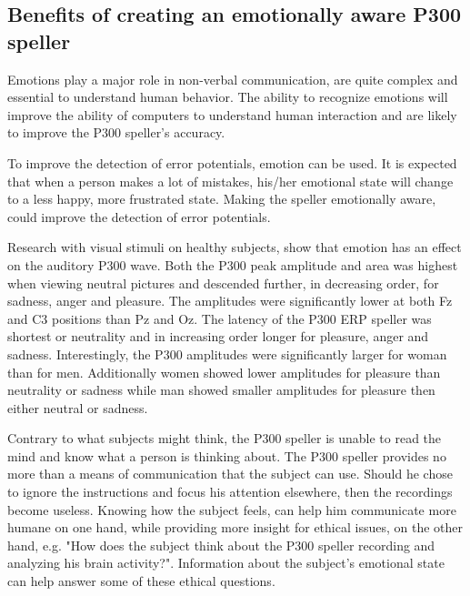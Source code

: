 \subsection{Benefits of creating an emotionally aware P300 speller}

Emotions play a major role in non-verbal communication, are quite complex and essential to understand human behavior. The ability to recognize emotions will improve the ability of computers to understand human interaction\cite{CompRecognizeEmotion} and are likely to improve the P300 speller's accuracy.

\npar

To improve the detection of error potentials, emotion can be used. It is expected that when a person makes a lot of mistakes, his/her emotional state will change to a less happy, more frustrated state. Making the speller emotionally aware, could improve the detection of error potentials.

\npar

Research with visual stimuli on healthy subjects, show that emotion has an effect on the auditory P300 wave\cite{AuditoryP300Effect}. Both the P300 peak amplitude and area was highest when viewing neutral pictures and descended further, in decreasing order, for sadness, anger and pleasure. The amplitudes were significantly lower at both Fz and C3 positions than Pz and Oz. The latency of the P300 ERP speller was shortest or neutrality and in increasing order longer for pleasure, anger and sadness. Interestingly, the P300 amplitudes were significantly larger for woman than for men. Additionally women showed lower amplitudes for pleasure than neutrality or sadness while man showed smaller amplitudes for pleasure then either neutral or sadness. 

\npar

Contrary to what subjects might think, the P300 speller is unable to read the mind and know what a person is thinking about\cite{P300Origin}. The P300 speller provides no more than a means of communication that the subject can use. Should he chose to ignore the instructions and focus his attention elsewhere, then the recordings become useless. Knowing how the subject feels, can help him communicate more humane on one hand, while providing more insight for ethical issues, on the other hand, e.g. "How does the subject think about the P300 speller recording and analyzing his brain activity?". Information about the subject's emotional state can help answer some of these ethical questions.

